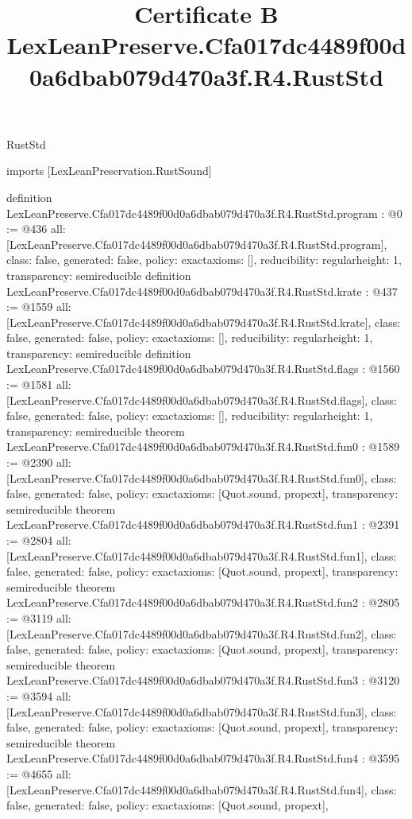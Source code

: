 \begin{lexlean}{RustStd}
\title{Certificate B LexLeanPreserve.Cfa017dc4489f00d0a6dbab079d470a3f.R4.RustStd}
\begin{coremodule}
imports [LexLeanPreservation.RustSound]

definition LexLeanPreserve.Cfa017dc4489f00d0a6dbab079d470a3f.R4.RustStd.program : @0 := @436 {
  all: [LexLeanPreserve.Cfa017dc4489f00d0a6dbab079d470a3f.R4.RustStd.program],
  class: false,
  generated: false,
  policy: exact{axioms: []},
  reducibility: regular{height: 1},
  transparency: semireducible
}
definition LexLeanPreserve.Cfa017dc4489f00d0a6dbab079d470a3f.R4.RustStd.krate : @437 := @1559 {
  all: [LexLeanPreserve.Cfa017dc4489f00d0a6dbab079d470a3f.R4.RustStd.krate],
  class: false,
  generated: false,
  policy: exact{axioms: []},
  reducibility: regular{height: 1},
  transparency: semireducible
}
definition LexLeanPreserve.Cfa017dc4489f00d0a6dbab079d470a3f.R4.RustStd.flags : @1560 := @1581 {
  all: [LexLeanPreserve.Cfa017dc4489f00d0a6dbab079d470a3f.R4.RustStd.flags],
  class: false,
  generated: false,
  policy: exact{axioms: []},
  reducibility: regular{height: 1},
  transparency: semireducible
}
theorem LexLeanPreserve.Cfa017dc4489f00d0a6dbab079d470a3f.R4.RustStd.fun0 : @1589 := @2390 {
  all: [LexLeanPreserve.Cfa017dc4489f00d0a6dbab079d470a3f.R4.RustStd.fun0],
  class: false,
  generated: false,
  policy: exact{axioms: [Quot.sound, propext]},
  transparency: semireducible
}
theorem LexLeanPreserve.Cfa017dc4489f00d0a6dbab079d470a3f.R4.RustStd.fun1 : @2391 := @2804 {
  all: [LexLeanPreserve.Cfa017dc4489f00d0a6dbab079d470a3f.R4.RustStd.fun1],
  class: false,
  generated: false,
  policy: exact{axioms: [Quot.sound, propext]},
  transparency: semireducible
}
theorem LexLeanPreserve.Cfa017dc4489f00d0a6dbab079d470a3f.R4.RustStd.fun2 : @2805 := @3119 {
  all: [LexLeanPreserve.Cfa017dc4489f00d0a6dbab079d470a3f.R4.RustStd.fun2],
  class: false,
  generated: false,
  policy: exact{axioms: [Quot.sound, propext]},
  transparency: semireducible
}
theorem LexLeanPreserve.Cfa017dc4489f00d0a6dbab079d470a3f.R4.RustStd.fun3 : @3120 := @3594 {
  all: [LexLeanPreserve.Cfa017dc4489f00d0a6dbab079d470a3f.R4.RustStd.fun3],
  class: false,
  generated: false,
  policy: exact{axioms: [Quot.sound, propext]},
  transparency: semireducible
}
theorem LexLeanPreserve.Cfa017dc4489f00d0a6dbab079d470a3f.R4.RustStd.fun4 : @3595 := @4655 {
  all: [LexLeanPreserve.Cfa017dc4489f00d0a6dbab079d470a3f.R4.RustStd.fun4],
  class: false,
  generated: false,
  policy: exact{axioms: [Quot.sound, propext]},
}
\end{coremodule}
\end{lexlean}
